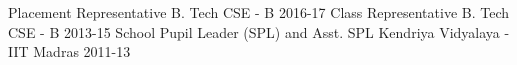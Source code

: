 \begin{cvhonors}
  \cvhonor
    {Placement Representative}
    {B. Tech CSE - B}
    {\empty}
    {2016-17}
  \cvhonor
    {Class Representative}
    {B. Tech CSE - B}
    {\empty}
    {2013-15}
  \cvhonor
    {School Pupil Leader (SPL) and Asst. SPL}
    {Kendriya Vidyalaya - IIT Madras}
    {\empty}
    {2011-13}
\end{cvhonors}
